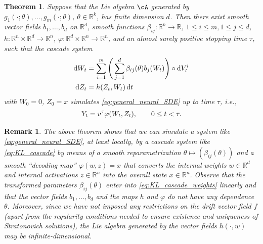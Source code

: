 \documentclass[letterpaper, 10pt, conference]{ieeeconf}
\def\Reals{{\mathbb R}}
\def\trn{{\hbox{\it\tiny T}}} %
\newtheorem{theorem}{Theorem}
\newtheorem{remark}{Remark}
\begin{document}
\begin{theorem} Suppose that the Lie algebra $\cA$ generated by $g_1(\cdot;\theta),\dots,g_m(\cdot;\theta)$, $\theta \in \Reals^k$, has finite dimension $d$. Then there exist smooth vector fields $b_1,\dots,b_d$ on $\Reals^d$, smooth functions $\beta_{ij} : \Reals^k \to \Reals$, $1 \le i \le m, 1 \le j \le d$, $h : \Reals^n \times \Reals^d \to \Reals^n$, $\varphi : \Reals^d \times \Reals^n \to \Reals^n$, and an almost surely positive stopping time $\tau$, such that the cascade system\begin{subequations}\label{eq:KL_cascade}
	\begin{align}
		\dif W_t &= \sum^m_{i=1}\Bigg(\sum^d_{j=1}\beta_{ij}(\theta)b_j(W_t)\Bigg)  \circ \dif V^i_t \label{eq:KL_cascade_weights}\\
		\dif Z_t &= h(Z_t,W_t) \dif t 
	\end{align}	
	\end{subequations}
	with $W_0 = 0$, $Z_0 = x$ simulates \eqref{eq:general_neural_SDE} up to time $\tau$, i.e., 
	\begin{align*}
		Y_t = v^\trn \varphi(W_t,Z_t), \qquad 0 \le t < \tau.
	\end{align*}
\end{theorem}
\begin{remark} {\em The above theorem shows that we can simulate a system like \eqref{eq:general_neural_SDE}, at least locally, by a cascade system like \eqref{eq:KL_cascade} by means of a smooth reparametrization $\theta \mapsto (\beta_{ij}(\theta))$ and a smooth ``decoding map'' $\varphi(w,z) = x$ that converts the internal weights $w \in \Reals^d$ and internal activations $z \in \Reals^n$ into the overall state $x \in \Reals^n$. Observe that the transformed parameters $\beta_{ij}(\theta)$ enter into \eqref{eq:KL_cascade_weights} linearly and that the vector fields $b_1,\dots,b_d$ and the maps $h$ and $\varphi$ do not have any dependence $\theta$. Moreover, since we have not imposed any restrictions on the drift vector field $f$ (apart from the regularity conditions needed to ensure existence and uniqueness of Stratonovich solutions), the Lie algebra generated by the vector fields $h(\cdot,w)$ may be infinite-dimensional.}
\end{remark}
\end{document}
